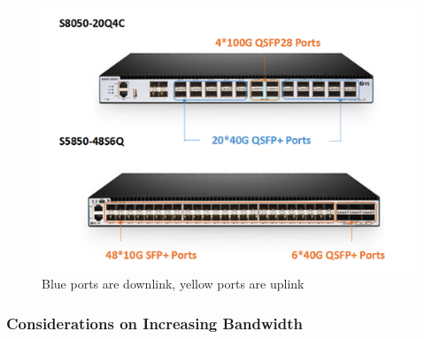 \begin{figure}[htbp]
   \centering
   \includegraphics{images/downuplink_switch.png}
   \caption{Blue ports are downlink, yellow ports are uplink}
   \label{fig:downuplink_switch}
\end{figure}

\subsubsection{Considerations on Increasing Bandwidth}

